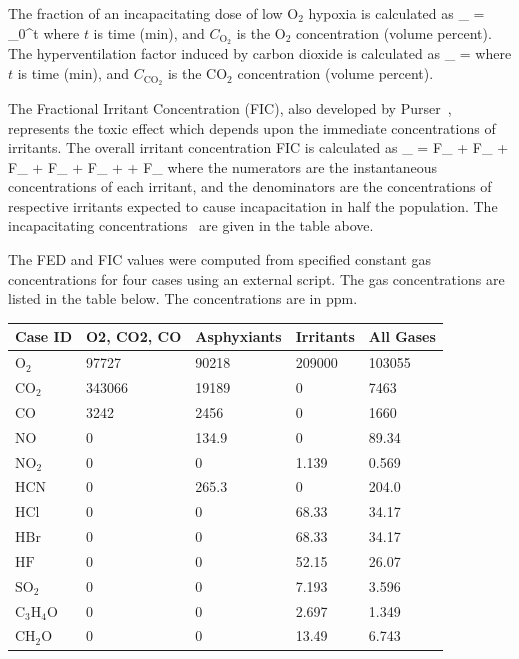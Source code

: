 \documentclass[11pt]{book}
\begin{document}
The fraction of an incapacitating dose of low O${}_2$ hypoxia is calculated as
\be
{}_ =  \int_0^t 
\ee
where $t$ is time (min), and $C_\mathrm{O_2}$ is the O${}_2$ concentration (volume percent).
The hyperventilation factor induced by carbon dioxide is calculated as
\be
{}_ =  \label{co2hyp}
\ee
where $t$ is time (min), and $C_\mathrm{CO_2}$ is the CO${}_2$ concentration (volume percent).

The Fractional Irritant Concentration (FIC), also developed by Purser~\cite{SFPE:Purser}, represents the toxic effect which
depends upon the immediate concentrations of irritants. The overall irritant concentration FIC is calculated as
\be
{}_ =
        {F_} +
        {F_} +
         {F_} +
       {F_} +
       {F_} +
     +
      {F_}
\ee
where the numerators are the instantaneous concentrations of each irritant, and the denominators are the concentrations of respective irritants
expected to cause incapacitation in half the population. The incapacitating concentrations~\cite{SFPE:Purser} are given in the table above.

The FED and FIC values were computed from specified constant gas concentrations for four cases using an external script.
The gas concentrations are listed in the table below. The concentrations are in ppm.
\begin{center}
\begin{tabular}{|l|l|l|l|l|}
\hline Case ID & O2, CO2, CO & Asphyxiants & Irritants & All Gases \\ \hline \hline
$\mathrm{O_2}$ & 97727 & 90218 & 209000 & 103055 \\ \hline
$\mathrm{CO_2}$ & 343066 & 19189 & 0 & 7463 \\ \hline
$\mathrm{CO}$ & 3242 & 2456 & 0 & 1660 \\ \hline
$\mathrm{NO}$ & 0 & 134.9 & 0 & 89.34 \\ \hline
$\mathrm{NO_2}$ & 0 & 0 & 1.139 & 0.569 \\ \hline
$\mathrm{HCN}$ & 0 & 265.3 & 0 & 204.0 \\ \hline
$\mathrm{HCl}$ & 0 & 0 & 68.33 & 34.17 \\ \hline
$\mathrm{HBr}$ & 0 & 0 & 68.33 & 34.17 \\ \hline
$\mathrm{HF}$ & 0 & 0 & 52.15 & 26.07 \\ \hline
$\mathrm{SO_2}$ & 0 & 0 & 7.193 & 3.596 \\ \hline
$\mathrm{C_3H_4O}$ & 0 & 0 & 2.697 & 1.349 \\ \hline
$\mathrm{CH_2O}$ & 0 & 0 & 13.49 & 6.743  \\ \hline
\end{tabular}
\end{center}
\end{document}
